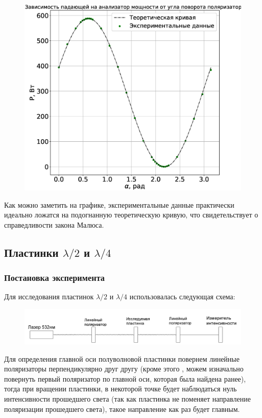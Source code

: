 \documentclass[a4paper,14pt]{extarticle}
\begin{document}
				\begin{figure}[h!]
					\centering
					\includegraphics[width=1\linewidth]{Malus.eps}
					\label{fig6}
				\end{figure}
				
				Как можно заметить на графике, экспериментальные данные практически идеально ложатся на подогнанную теоретическую кривую, что свидетельствует о справедливости закона Малюса.
		\subsection{Пластинки $\lambda / 2$ и $\lambda /4$}
			\subsubsection{Постановка эксперимента}
				Для исследования пластинок $\lambda / 2$ и $\lambda / 4$ использовалась следующая схема:
				
				\begin{figure}[h!]
					\centering
					\includegraphics[width=1\linewidth]{Lambda.png}
					\label{fig7}
				\end{figure}
				
				Для определения главной оси полуволновой пластинки повернем линейные поляризаторы перпендикулярно друг другу (кроме этого , можем изначально повернуть первый поляризатор по главной оси, которая была найдена ранее), тогда при вращении пластинки, в некоторой точке будет наблюдаться нуль интенсивности прошедшего света (так как пластинка не поменяет направление поляризации прошедшего света), такое направление как раз будет главным.
				
\end{document}
